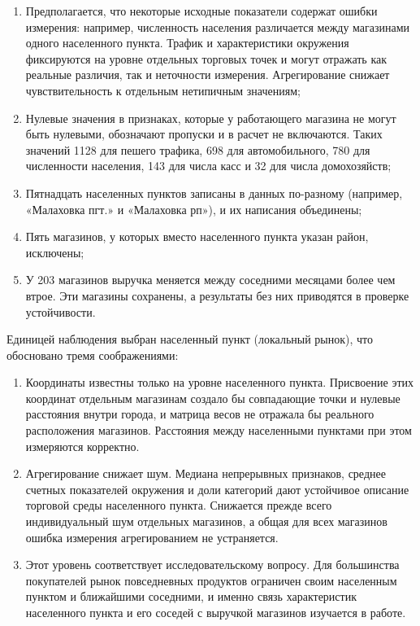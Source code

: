 \documentclass[12pt, a4paper]{article}
\begin{document}
\begin{enumerate}
    \item Предполагается, что некоторые исходные показатели содержат ошибки измерения: например,
    численность населения различается между магазинами одного населенного пункта. Трафик и
    характеристики окружения фиксируются на уровне отдельных торговых точек и могут отражать
    как реальные различия, так и неточности измерения. Агрегирование снижает чувствительность к
    отдельным нетипичным значениям;
    \item Нулевые значения в признаках, которые у работающего магазина не могут быть нулевыми,
    обозначают пропуски и в расчет не включаются. Таких значений 1128 для пешего трафика,
    698 для автомобильного, 780 для численности населения, 143 для числа касс и 32 для числа
    домохозяйств;
    \item Пятнадцать населенных пунктов записаны в данных по-разному (например, «Малаховка пгт.»
    и «Малаховка рп»), и их написания объединены;
    \item Пять магазинов, у которых вместо населенного пункта указан район, исключены;
    \item У 203 магазинов выручка меняется между соседними месяцами более чем втрое. Эти магазины
    сохранены, а результаты без них приводятся в проверке устойчивости.
\end{enumerate}

Единицей наблюдения выбран населенный пункт (локальный рынок), что обосновано тремя соображениями:

\begin{enumerate}
    \item Координаты известны только на уровне населенного пункта. Присвоение этих координат
    отдельным магазинам создало бы совпадающие точки и нулевые расстояния внутри города, и
    матрица весов не отражала бы реального расположения магазинов. Расстояния между населенными
    пунктами при этом измеряются корректно.
    \item Агрегирование снижает шум. Медиана непрерывных признаков, среднее счетных показателей
    окружения и доли категорий дают устойчивое описание торговой среды населенного пункта.
    Снижается прежде всего индивидуальный шум отдельных магазинов, а общая для всех магазинов
    ошибка измерения агрегированием не устраняется.
    \item Этот уровень соответствует исследовательскому вопросу. Для большинства покупателей
    рынок повседневных продуктов ограничен своим населенным пунктом и ближайшими соседними, и
    именно связь характеристик населенного пункта и его соседей с выручкой магазинов изучается в
    работе.
\end{enumerate}
\end{document}
